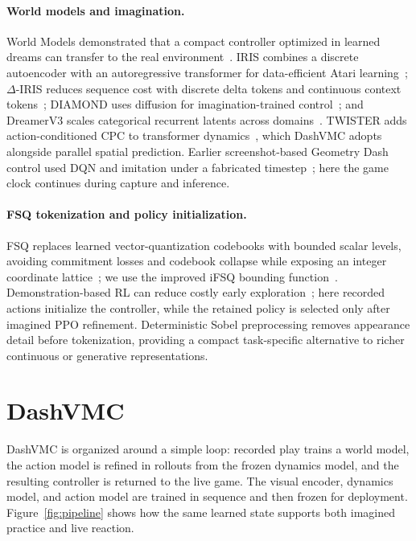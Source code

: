 \paragraph{World models and imagination.}
World Models demonstrated that a compact controller optimized in learned dreams can transfer to the real environment~\citep{ha2018world}.
IRIS combines a discrete autoencoder with an autoregressive transformer for data-efficient Atari learning~\citep{micheli2023iris}; \(\Delta\)-IRIS reduces sequence cost with discrete delta tokens and continuous context tokens~\citep{micheli2024deltairis}; DIAMOND uses diffusion for imagination-trained control~\citep{alonso2024diamond}; and DreamerV3 scales categorical recurrent latents across domains~\citep{hafner2025dreamerv3}.
TWISTER adds action-conditioned CPC to transformer dynamics~\citep{burchi2025twister}, which DashVMC adopts alongside parallel spatial prediction.
Earlier screenshot-based Geometry Dash control used DQN and imitation under a fabricated timestep~\citep{li2017geometrydash}; here the game clock continues during capture and inference.

\paragraph{FSQ tokenization and policy initialization.}
FSQ replaces learned vector-quantization codebooks with bounded scalar levels, avoiding commitment losses and codebook collapse while exposing an integer coordinate lattice~\citep{mentzer2024fsq}; we use the improved iFSQ bounding function~\citep{lin2026ifsq}.
Demonstration-based RL can reduce costly early exploration~\citep{hester2018deep,baker2022vpt}; here recorded actions initialize the controller, while the retained policy is selected only after imagined PPO refinement.
Deterministic Sobel preprocessing removes appearance detail before tokenization, providing a compact task-specific alternative to richer continuous or generative representations.

\FloatBarrier
\section{DashVMC}
\label{sec:method}

DashVMC is organized around a simple loop: recorded play trains a world model, the action model is refined in rollouts from the frozen dynamics model, and the resulting controller is returned to the live game.
The visual encoder, dynamics model, and action model are trained in sequence and then frozen for deployment.
Figure~\ref{fig:pipeline} shows how the same learned state supports both imagined practice and live reaction.


